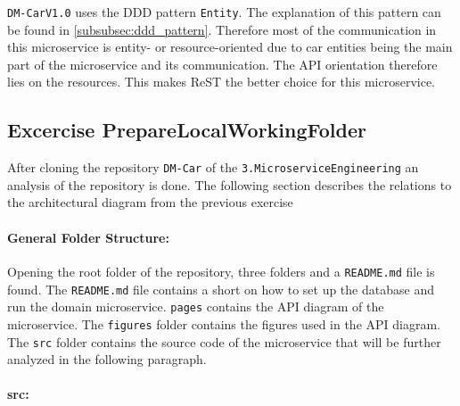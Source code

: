 \texttt{DM-CarV1.0} uses the DDD pattern \texttt{Entity}.
The explanation of this pattern can be found in \autoref{subsubsec:ddd_pattern}.
Therefore most of the communication in this microservice is entity- or resource-oriented due to car entities being the main part of the microservice and its communication.
The API orientation therefore lies on the resources.
This makes ReST the better choice for this microservice.

\subsection{Excercise PrepareLocalWorkingFolder}
\label{subsec:prepare_local_working_folder}
After cloning the repository \texttt{DM-Car} of the \texttt{3.MicroserviceEngineering} an analysis of the repository is done.
The following section describes the relations to the architectural diagram from the previous exercise 

\paragraph*{General Folder Structure:}
Opening the root folder of the repository, three folders and a \texttt{README.md} file is found.
The \texttt{README.md} file contains a short on how to set up the database and run the domain microservice.
\texttt{pages} contains the API diagram of the microservice.
The \texttt{figures} folder contains the figures used in the API diagram. 
The \texttt{src} folder contains the source code of the microservice that will be further analyzed in the following paragraph.

\paragraph*{src:}
